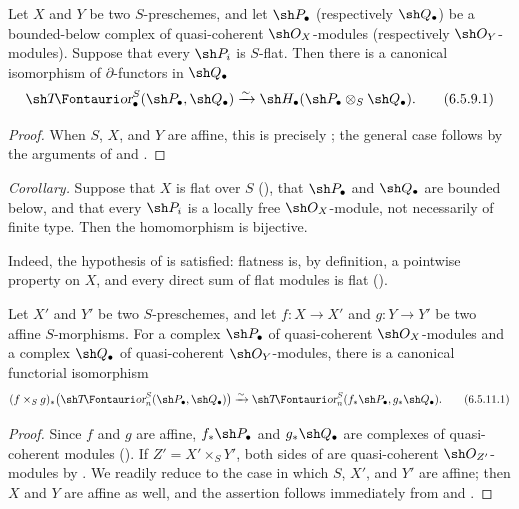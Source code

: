 \begin{corollary}[6.5.9]
\label{III.6.5.9}
Let $X$ and $Y$ be two $S$-preschemes, and let
$\sh P_\bullet$ (respectively $\sh Q_\bullet$) be a
bounded-below complex of quasi-coherent $\sh O_X$-modules
(respectively $\sh O_Y$-modules).  Suppose that every
$\sh P_i$ is $S$-flat.  Then there is a canonical isomorphism of
$\partial$-functors in $\sh Q_\bullet$
\[
  \shTor_\bullet^S(\sh P_\bullet,\sh Q_\bullet)
  \xrightarrow{\sim}
  \sh H_\bullet(\sh P_\bullet\otimes_S\sh Q_\bullet).
  \tag{6.5.9.1}\label{III.6.5.9.1}
\]
\end{corollary}

\begin{proof}
When $S$, $X$, and $Y$ are affine, this is precisely
; the general case follows by the arguments of
 and .
\end{proof}

\begin{env}[6.5.10]
\label{III.6.5.10}
\emph{Corollary.}
Suppose that $X$ is flat over $S$ (), that
$\sh P_\bullet$ and $\sh Q_\bullet$ are bounded below, and that
every $\sh P_i$ is a locally free $\sh O_X$-module, not
necessarily of finite type.  Then the homomorphism
 is bijective.

Indeed, the hypothesis of  is satisfied:
flatness is, by definition, a pointwise property on $X$, and
every direct sum of flat modules is flat ().
\end{env}

\begin{proposition}[6.5.11]
\label{III.6.5.11}
Let $X'$ and $Y'$ be two $S$-preschemes, and let
$f:X\to X'$ and $g:Y\to Y'$ be two affine $S$-morphisms.  For a
complex $\sh P_\bullet$ of quasi-coherent $\sh O_X$-modules and
a complex $\sh Q_\bullet$ of quasi-coherent $\sh O_Y$-modules,
there is a canonical functorial isomorphism
\[
  (f\times_Sg)_*
  \bigl(\shTor_n^S(\sh P_\bullet,\sh Q_\bullet)\bigr)
  \xrightarrow{\sim}
  \shTor_n^S(f_*\sh P_\bullet,g_*\sh Q_\bullet).
  \tag{6.5.11.1}\label{III.6.5.11.1}
\]
\end{proposition}

\begin{proof}
Since $f$ and $g$ are affine, $f_*\sh P_\bullet$ and
$g_*\sh Q_\bullet$ are complexes of quasi-coherent modules
().  If $Z'=X'\times_SY'$, both sides of
 are quasi-coherent $\sh O_{Z'}$-modules by
.  We readily reduce to the case in which $S$,
$X'$, and $Y'$ are affine; then $X$ and $Y$ are affine as well,
and the assertion follows immediately from
 and .
\end{proof}

